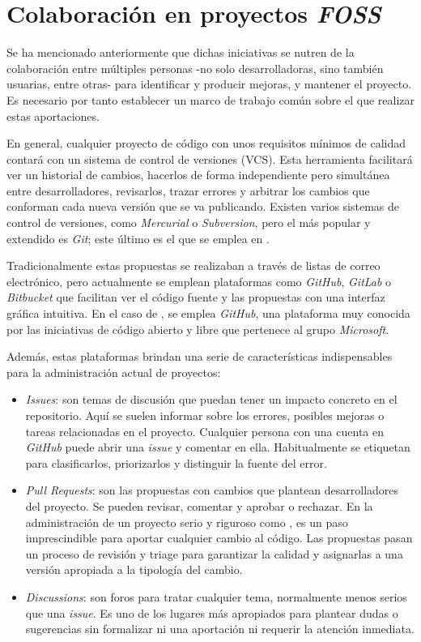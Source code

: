 \section{Colaboración en proyectos \textit{FOSS}} \label{sct:colaboracion_FOSS}

Se ha mencionado anteriormente que dichas iniciativas se nutren de la colaboración entre múltiples personas -no solo desarrolladoras, sino también usuarias, entre otras- para identificar y producir mejoras, y mantener el proyecto. Es necesario por tanto establecer un marco de trabajo común sobre el que realizar estas aportaciones.

En general, cualquier proyecto de código con unos requisitos mínimos de calidad contará con un sistema de control de versiones (\gls{VCS}). Esta herramienta facilitará ver un historial de cambios, hacerlos de forma independiente pero simultánea entre desarrolladores, revisarlos, trazar errores y arbitrar los cambios que conforman cada nueva versión que se va publicando. Existen varios sistemas de control de versiones, como \textit{Mercurial} o \textit{Subversion}, pero el más popular y extendido es \textit{Git}; este último es el que se emplea en \pvlibpy.

Tradicionalmente estas propuestas se realizaban a través de listas de correo electrónico, pero actualmente se emplean plataformas como \textit{GitHub}, \textit{GitLab} o \textit{Bitbucket} que facilitan ver el código fuente y las propuestas con una \gls{interfaz gráfica} intuitiva. En el caso de \pvlibpy, se emplea \textit{GitHub}, una plataforma muy conocida por las iniciativas de código abierto y libre que pertenece al grupo \textit{Microsoft}.

Además, estas plataformas brindan una serie de características indispensables para la administración actual de proyectos:

\begin{itemize}
    \item \textit{Issues}: son temas de discusión que puedan tener un impacto concreto en el \gls{repositorio}. Aquí se suelen informar sobre los errores, posibles mejoras o tareas relacionadas en el proyecto. Cualquier persona con una cuenta en \textit{GitHub} puede abrir una \textit{\gls{issue}} y comentar en ella. Habitualmente se etiquetan para clasificarlos, priorizarlos y distinguir la fuente del error.
    \item \textit{Pull Requests}: son las propuestas con cambios que plantean desarrolladores del proyecto. Se pueden revisar, comentar y aprobar o rechazar. En la administración de un proyecto serio y riguroso como \pvlibpy, es un paso imprescindible para aportar cualquier cambio al código. Las propuestas pasan un proceso de revisión y triage para garantizar la calidad y asignarlas a una versión apropiada a la tipología del cambio.
    \item \textit{Discussions}: son foros para tratar cualquier tema, normalmente menos serios que una \textit{\gls{issue}}. Es uno de los lugares más apropiados para plantear dudas o sugerencias sin formalizar ni una aportación ni requerir la atención inmediata.
\end{itemize}

